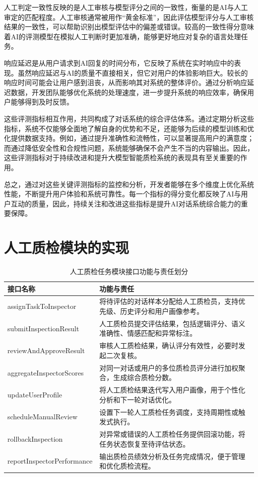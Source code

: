 人工判定一致性反映的是人工审核与模型评分之间的一致性，衡量的是AI与人工审定的匹配程度。人工审核通常被用作“黄金标准”，因此评估模型评分与人工审核结果的一致性，可以帮助识别出模型评估中的偏差或错误。较高的一致性得分意味着AI的评测模型在模拟人工判断时更加准确，能够更好地应对复杂的语言处理任务。

响应延迟是从用户请求到AI回复的时间分布，它反映了系统在实时响应中的表现。虽然响应延迟与AI的质量不直接相关，但它对用户的体验影响巨大。较长的响应时间可能会让用户感到沮丧，从而影响其对系统的整体评价。通过分析响应延迟数据，开发团队能够优化系统的处理速度，进一步提升系统的响应效率，确保用户能够得到及时反馈。

这些评测指标相互作用，共同构成了对话系统的综合评估体系。通过定期分析这些指标，系统不仅能够全面地了解自身的优势和不足，还能够为后续的模型训练和优化提供数据支持。例如，通过提升准确性和流畅性，可以显著提高用户的满意度；而通过降低安全性和合规性问题，系统能够确保不会产生不当的内容输出。因此，这些评测指标对于持续改进和提升大模型智能质检系统的表现具有至关重要的作用。

总之，通过对这些关键评测指标的监控和分析，开发者能够在多个维度上优化系统性能，不断提升用户体验和系统可靠性。每一个指标的得分变化都反映了AI与用户互动的质量，因此，持续关注和改进这些指标是提升AI对话系统综合能力的重要保障。
\section{人工质检模块的实现}
\begin{table}[H]
\centering
\caption{人工质检任务模块接口功能与责任划分}
\label{tab:manual-qc-module}
{\renewcommand{\arraystretch}{1.2}
\begin{tabular}{p{4cm} p{10cm}}
\hline
接口名称 & 功能与责任 \\
\hline
assignTaskToInspector & 将待评估的对话样本分配给人工质检员，支持优先级、历史评分和用户画像参考。 \\ \hline
submitInspectionResult & 人工质检员提交评估结果，包括逻辑评分、语义准确性、情感匹配和异常标注。 \\ \hline
reviewAndApproveResult & 审核人工质检结果，确认评分有效性，必要时发起二次复核。 \\ \hline
aggregateInspectorScores & 对同一对话或用户的多位质检员评分进行加权聚合，生成综合质检分数。 \\ \hline
updateUserProfile & 将人工质检结果迭代写入用户画像，用于个性化分析和下一轮对话优化。 \\ \hline
scheduleManualReview & 设置下一轮人工质检任务调度，支持周期性或触发式执行。 \\ \hline
rollbackInspection & 对异常或错误的人工质检任务提供回滚功能，将任务状态恢复至待评估状态。 \\ \hline
reportInspectorPerformance & 输出质检员绩效分析及任务完成情况，便于管理和优化质检流程。 \\
\hline
\end{tabular}}
\end{table}

